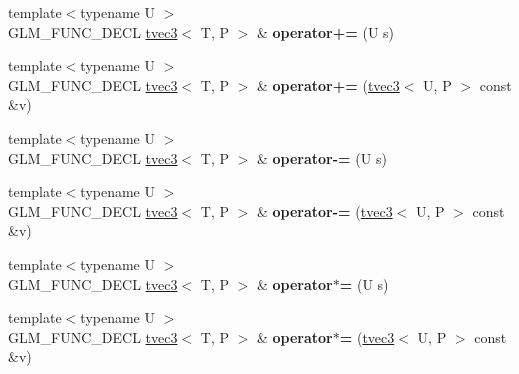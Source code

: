 \begin{DoxyCompactItemize}
\item 
\hypertarget{structglm_1_1detail_1_1tvec3_a1c2a116b686e23bab8fae7780950ef38}{{\footnotesize template$<$typename U $>$ }\\G\-L\-M\-\_\-\-F\-U\-N\-C\-\_\-\-D\-E\-C\-L \hyperlink{structglm_1_1detail_1_1tvec3}{tvec3}$<$ T, P $>$ \& {\bfseries operator+=} (U s)}\label{structglm_1_1detail_1_1tvec3_a1c2a116b686e23bab8fae7780950ef38}

\item 
\hypertarget{structglm_1_1detail_1_1tvec3_a9bd5c6f729076573c980b70cc16a429b}{{\footnotesize template$<$typename U $>$ }\\G\-L\-M\-\_\-\-F\-U\-N\-C\-\_\-\-D\-E\-C\-L \hyperlink{structglm_1_1detail_1_1tvec3}{tvec3}$<$ T, P $>$ \& {\bfseries operator+=} (\hyperlink{structglm_1_1detail_1_1tvec3}{tvec3}$<$ U, P $>$ const \&v)}\label{structglm_1_1detail_1_1tvec3_a9bd5c6f729076573c980b70cc16a429b}

\item 
\hypertarget{structglm_1_1detail_1_1tvec3_aafbf3f712a6add1677828784286ab62d}{{\footnotesize template$<$typename U $>$ }\\G\-L\-M\-\_\-\-F\-U\-N\-C\-\_\-\-D\-E\-C\-L \hyperlink{structglm_1_1detail_1_1tvec3}{tvec3}$<$ T, P $>$ \& {\bfseries operator-\/=} (U s)}\label{structglm_1_1detail_1_1tvec3_aafbf3f712a6add1677828784286ab62d}

\item 
\hypertarget{structglm_1_1detail_1_1tvec3_a9cb33db5b994eea9724fdd8c30b08873}{{\footnotesize template$<$typename U $>$ }\\G\-L\-M\-\_\-\-F\-U\-N\-C\-\_\-\-D\-E\-C\-L \hyperlink{structglm_1_1detail_1_1tvec3}{tvec3}$<$ T, P $>$ \& {\bfseries operator-\/=} (\hyperlink{structglm_1_1detail_1_1tvec3}{tvec3}$<$ U, P $>$ const \&v)}\label{structglm_1_1detail_1_1tvec3_a9cb33db5b994eea9724fdd8c30b08873}

\item 
\hypertarget{structglm_1_1detail_1_1tvec3_a414982cd74a45512de204d72ea147c46}{{\footnotesize template$<$typename U $>$ }\\G\-L\-M\-\_\-\-F\-U\-N\-C\-\_\-\-D\-E\-C\-L \hyperlink{structglm_1_1detail_1_1tvec3}{tvec3}$<$ T, P $>$ \& {\bfseries operator$\ast$=} (U s)}\label{structglm_1_1detail_1_1tvec3_a414982cd74a45512de204d72ea147c46}

\item 
\hypertarget{structglm_1_1detail_1_1tvec3_aac5ebc20b3a00cdd090b9320186b18c2}{{\footnotesize template$<$typename U $>$ }\\G\-L\-M\-\_\-\-F\-U\-N\-C\-\_\-\-D\-E\-C\-L \hyperlink{structglm_1_1detail_1_1tvec3}{tvec3}$<$ T, P $>$ \& {\bfseries operator$\ast$=} (\hyperlink{structglm_1_1detail_1_1tvec3}{tvec3}$<$ U, P $>$ const \&v)}\label{structglm_1_1detail_1_1tvec3_aac5ebc20b3a00cdd090b9320186b18c2}


\end{DoxyCompactItemize}
